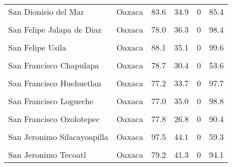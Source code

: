 \documentclass[
]{report}
\begin{document}
\begin{longtable}[t]{llrrrr}
San Dionisio del Mar & Oaxaca & 83.6 & 34.9 & 0 & 85.4\\
\cellcolor{gray!6}{San Dionisio Ocotepec} & \cellcolor{gray!6}{Oaxaca} & \cellcolor{gray!6}{82.8} & \cellcolor{gray!6}{33.3} & \cellcolor{gray!6}{0} & \cellcolor{gray!6}{96.1}\\
San Felipe Jalapa de Diaz & Oaxaca & 78.0 & 36.3 & 0 & 98.4\\
\addlinespace
\cellcolor{gray!6}{San Felipe Tejalapam} & \cellcolor{gray!6}{Oaxaca} & \cellcolor{gray!6}{97.0} & \cellcolor{gray!6}{46.8} & \cellcolor{gray!6}{0} & \cellcolor{gray!6}{52.1}\\
San Felipe Usila & Oaxaca & 88.1 & 35.1 & 0 & 99.6\\
\cellcolor{gray!6}{San Francisco Cajonos} & \cellcolor{gray!6}{Oaxaca} & \cellcolor{gray!6}{95.2} & \cellcolor{gray!6}{33.2} & \cellcolor{gray!6}{0} & \cellcolor{gray!6}{98.8}\\
San Francisco Chapulapa & Oaxaca & 78.7 & 30.4 & 0 & 53.6\\
\cellcolor{gray!6}{San Francisco del Mar} & \cellcolor{gray!6}{Oaxaca} & \cellcolor{gray!6}{90.4} & \cellcolor{gray!6}{42.7} & \cellcolor{gray!6}{0} & \cellcolor{gray!6}{79.1}\\
\addlinespace
San Francisco Huehuetlan & Oaxaca & 77.2 & 33.7 & 0 & 97.7\\
\cellcolor{gray!6}{San Francisco Jaltepetongo} & \cellcolor{gray!6}{Oaxaca} & \cellcolor{gray!6}{97.1} & \cellcolor{gray!6}{33.4} & \cellcolor{gray!6}{0} & \cellcolor{gray!6}{88.1}\\
San Francisco Logueche & Oaxaca & 77.0 & 35.0 & 0 & 98.8\\
\cellcolor{gray!6}{San Francisco Nuxano} & \cellcolor{gray!6}{Oaxaca} & \cellcolor{gray!6}{98.8} & \cellcolor{gray!6}{40.7} & \cellcolor{gray!6}{0} & \cellcolor{gray!6}{79.8}\\
San Francisco Ozolotepec & Oaxaca & 77.8 & 26.8 & 0 & 90.4\\
\addlinespace
\cellcolor{gray!6}{San Ildefonso Amatlan} & \cellcolor{gray!6}{Oaxaca} & \cellcolor{gray!6}{91.9} & \cellcolor{gray!6}{35.7} & \cellcolor{gray!6}{0} & \cellcolor{gray!6}{62.5}\\
San Jeronimo Silacayoapilla & Oaxaca & 97.5 & 44.1 & 0 & 59.3\\
\cellcolor{gray!6}{San Jeronimo Taviche} & \cellcolor{gray!6}{Oaxaca} & \cellcolor{gray!6}{93.4} & \cellcolor{gray!6}{41.1} & \cellcolor{gray!6}{0} & \cellcolor{gray!6}{68.4}\\
San Jeronimo Tecoatl & Oaxaca & 79.2 & 41.3 & 0 & 94.1\\

\end{longtable}
\end{document}
